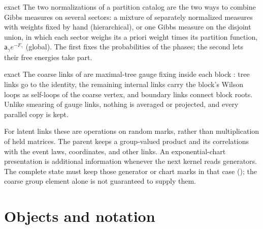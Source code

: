 \begin{analogy}{exact}
The two normalizations of a partition catalog are the two ways to combine Gibbs measures on several
sectors: a mixture of separately normalized measures with weights fixed by hand (hierarchical), or one
Gibbs measure on the disjoint union, in which each sector weighs its a priori weight times its partition
function, $\mathsf a_\gamma e^{-F_\gamma}$ (global). The first fixes the probabilities of the phases; the
second lets their free energies take part.
\end{analogy}

\begin{analogy}{exact}
The coarse links of  are maximal-tree gauge fixing inside each block
\citep{Creutz1977}: tree links go to the identity, the remaining internal links carry the block's Wilson
loops as self-loops of the coarse vertex, and boundary links connect block roots. Unlike smearing of
gauge links, nothing is averaged or projected, and every parallel copy is kept.
\end{analogy}

For latent links these are operations on random marks, rather than multiplication of held matrices.
The parent keeps a group-valued product and its correlations with the event laws, coordinates, and
other links. An exponential-chart presentation is additional information whenever the next kernel
reads generators. The complete state must keep those generator or chart marks in that case
(); the coarse group element alone is not guaranteed to supply them.

\section{Objects and notation}
\label{comp:ch12-notation}

